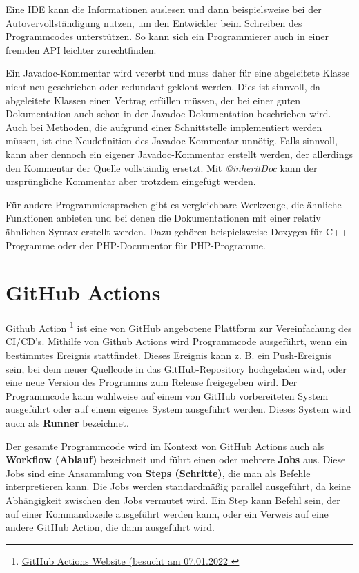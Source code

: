 Eine \ac{IDE} kann die Informationen auslesen und dann beispielsweise bei der Autovervollständigung nutzen, um den Entwickler beim Schreiben des Programmcodes unterstützen. So kann sich ein Programmierer auch in einer fremden \ac{API} leichter zurechtfinden.

Ein Javadoc-Kommentar wird vererbt und muss daher für eine abgeleitete Klasse nicht neu geschrieben oder redundant geklont werden. Dies ist sinnvoll, da abgeleitete Klassen einen Vertrag erfüllen müssen, der bei einer guten Dokumentation auch schon in der Javadoc-Dokumentation beschrieben wird. Auch bei Methoden, die aufgrund einer Schnittstelle implementiert werden müssen, ist eine Neudefinition des Javadoc-Kommentar unnötig. Falls sinnvoll, kann aber dennoch ein eigener Javadoc-Kommentar erstellt werden, der allerdings den Kommentar der Quelle vollständig ersetzt. Mit \textit{@inheritDoc} kann der ursprüngliche Kommentar aber trotzdem eingefügt werden.

Für andere Programmiersprachen gibt es vergleichbare Werkzeuge, die ähnliche Funktionen anbieten und bei denen die Dokumentationen mit einer relativ ähnlichen Syntax erstellt werden. Dazu gehören beispielsweise Doxygen für C++-Programme oder der PHP-Documentor für PHP-Programme. 



\section{GitHub Actions}\label{chapter:github_actions}

Github Action \footnote{\href{https://github.com/features/actions}{GitHub Actions Website (besucht am 07.01.2022 }} ist eine von GitHub angebotene Plattform zur Vereinfachung des \ac{CI/CD}'s. Mithilfe von  Github Actions wird Programmcode ausgeführt, wenn ein bestimmtes Ereignis stattfindet. Dieses Ereignis kann z. B. ein Push-Ereignis sein, bei dem neuer Quellcode in das GitHub-Repository hochgeladen wird, oder eine neue Version des Programms zum Release freigegeben wird. Der Programmcode kann wahlweise auf einem von  GitHub vorbereiteten System ausgeführt oder auf einem eigenes System ausgeführt werden. Dieses System wird auch als \textbf{Runner} bezeichnet.

Der gesamte Programmcode wird im Kontext von GitHub Actions auch als \textbf{Workflow (Ablauf)} bezeichneit und führt einen oder mehrere \textbf{Jobs} aus. Diese Jobs sind eine Ansammlung von \textbf{Steps (Schritte)}, die man als Befehle interpretieren kann. Die Jobs werden standardmäßig parallel ausgeführt, da keine Abhängigkeit zwischen den Jobs vermutet wird. Ein Step kann Befehl sein, der auf einer Kommandozeile ausgeführt werden kann, oder ein Verweis auf eine andere GitHub Action, die dann ausgeführt wird. 

